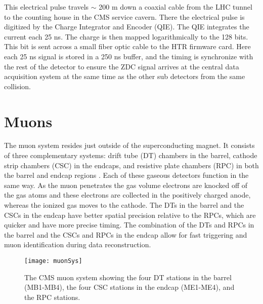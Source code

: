     This electrical pulse travels $\sim$ 200 m down a coaxial cable from the LHC
      tunnel to the counting house in the CMS service cavern. 
    There the electrical pulse is digitized by the Charge Integrator and Encoder 
      (QIE).
    The QIE integrates the current each 25 ns.
    The charge is then mapped logarithmically to the 128 bits. 
    This bit is sent across a small fiber optic cable to the HTR firmware card.
    Here each 25 ns signal is stored in a 250 ns buffer, and the timing is synchronize
      with the rest of the detector to ensure the ZDC signal arrives at the central
      data acquisition system at the same time as the other sub detectors from the 
      same collision. 
    
  \section{Muons}
    The muon system resides just outside of the superconducting magnet.
    It consists of three complementary systems: drift tube (DT) chambers in the
      barrel, cathode strip chambers (CSC) in the endcaps, and resistive 
      plate chambers (RPC) in both the barrel and endcap regions \cite{tCmsE}.
    Each of these gaseous detectors function in the same way.
    As the muon penetrates the gas volume electrons are knocked off of the 
      gas atoms and these electrons are collected in the positively charged
      anode, whereas the ionized gas moves to the cathode. 
    The DTs in the barrel and the CSCs in the endcap have better spatial 
      precision relative to the RPCs, which are quicker and have more
      precise timing. 
    The combination of the DTs and RPCs in the barrel and the CSCs and RPCs 
      in the endcap allow for fast triggering and muon identification during
      data reconstruction. 
    \begin{figure}[!Hhbt]
      \centering
      \texttt{[image: muonSys]}
      \caption{ The CMS muon system showing the four DT stations in 
        the barrel (MB1-MB4), the four CSC stations in the endcap (ME1-ME4), 
        and the RPC stations.}
      \label{fig:muonSys}
    \end{figure}

